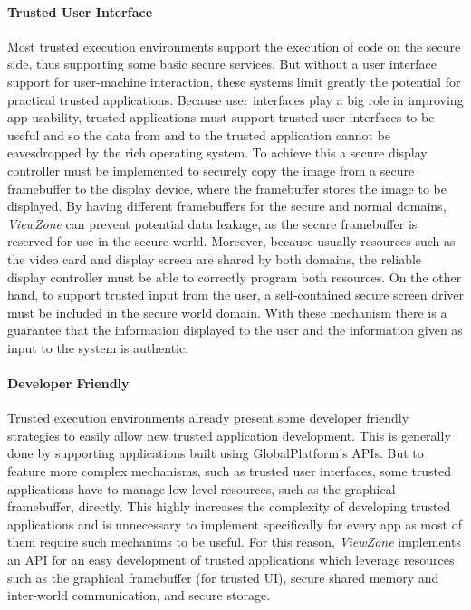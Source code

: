 \paragraph{\textbf{Trusted User Interface}}

Most trusted execution environments support the execution of code on the secure side, thus supporting some basic secure services. But without a user interface support for user-machine interaction, these systems limit greatly the potential for practical trusted applications. Because user interfaces play a big role in improving app usability, trusted applications must support trusted user interfaces to be useful and so the data from and to the trusted application cannot be eavesdropped by the rich operating system. To achieve this a secure display controller must be implemented to securely copy the image from a secure framebuffer to the display device, where the framebuffer stores the image to be displayed. By having different framebuffers for the secure and normal domains, \emph{ViewZone} can prevent potential data leakage, as the secure framebuffer is reserved for use in the secure world. Moreover, because usually resources such as the video card and display screen are shared by both domains, the reliable display controller must be able to correctly program both resources. On the other hand, to support trusted input from the user, a self-contained secure screen driver must be included in the secure world domain. With these mechanism there is a guarantee that the information displayed to the user and the information given as input to the system is authentic.

\paragraph{\textbf{Developer Friendly}}

Trusted execution environments already present some developer friendly strategies to easily allow new trusted application development. This is generally done by supporting applications built using GlobalPlatform's APIs. But to feature more complex mechanisms, such as trusted user interfaces, some trusted applications have to manage low level resources, such as the graphical framebuffer, directly. This highly increases the complexity of developing trusted applications and is unnecessary to implement specifically for every app as most of them require such mechanims to be useful. For this reason, \emph{ViewZone} implements an API for an easy development of trusted applications which leverage resources such as the graphical framebuffer (for trusted UI), secure shared memory and inter-world communication, and secure storage.

